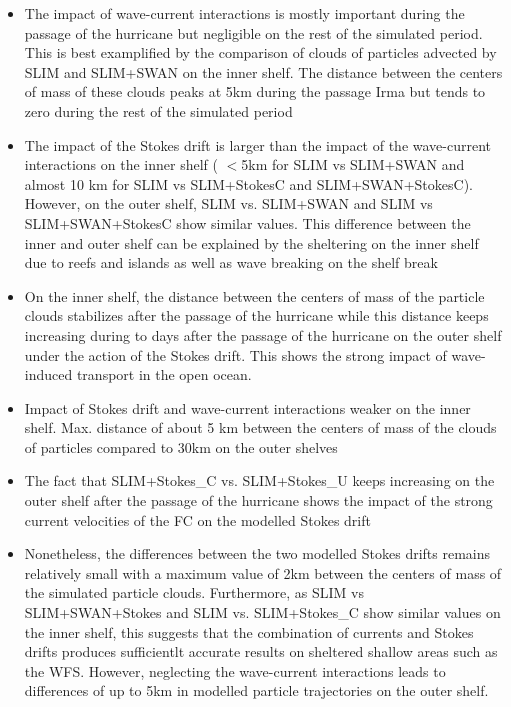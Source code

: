 \documentclass[11pt,a4paper]{article}
\begin{document}
\begin{itemize}
    \item The impact of wave-current interactions is mostly important during the passage of the hurricane but negligible on the rest of the simulated period. This is best examplified by the comparison of clouds of particles advected by SLIM and SLIM+SWAN on the inner shelf. The distance between the centers of mass of these clouds peaks at 5km during the passage Irma but tends to zero during the rest of the simulated period
    \item The impact of the Stokes drift is larger than the impact of the wave-current interactions on the inner shelf ( $<$5km for SLIM vs SLIM+SWAN and almost 10 km for SLIM vs SLIM+Stokes\textunderscore C and SLIM+SWAN+Stokes\textunderscore C). However, on the outer shelf, SLIM vs. SLIM+SWAN and SLIM vs SLIM+SWAN+Stokes\textunderscore C show similar values. This difference between the inner and outer shelf can be explained by the sheltering on the inner shelf due to reefs and islands as well as wave breaking on the shelf break
    \item On the inner shelf, the distance between the centers of mass of the particle clouds stabilizes after the passage of the hurricane while this distance keeps increasing during to days after the passage of the hurricane on the outer shelf under the action of the Stokes drift. This shows the strong impact of wave-induced transport in the open ocean. 
    \item Impact of Stokes drift and wave-current interactions weaker on the inner shelf. Max. distance of about 5 km between the centers of mass of the clouds of particles compared to 30km on the outer shelves
    \item The fact that SLIM+Stokes\_C vs. SLIM+Stokes\_U keeps increasing on the outer shelf after the passage of the hurricane shows the impact of the strong current velocities of the FC on the modelled Stokes drift
    \item Nonetheless, the differences between the two modelled Stokes drifts remains relatively small with a maximum value of 2km between the centers of mass of the simulated particle clouds. Furthermore, as SLIM vs SLIM+SWAN+Stokes and SLIM vs. SLIM+Stokes\_C show similar values on the inner shelf, this suggests that the combination of currents and Stokes drifts produces sufficientlt accurate results on sheltered shallow areas such as the WFS. However, neglecting the wave-current interactions leads to differences of up to 5km in modelled particle trajectories on the outer shelf. 
\end{itemize}
\end{document}
